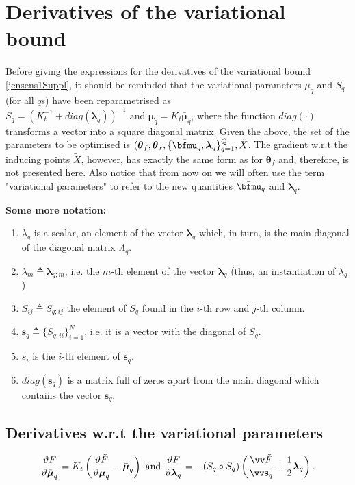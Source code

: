 
\section{Derivatives of the variational bound}
Before giving the expressions for the derivatives of the variational bound \eqref{jensens1Suppl},
it should be reminded that the variational parameters $\mu_q$ and $S_q$ (for all $q$s) have been
reparametrised as $S_q = \left( \mathit{K}_t^{-1} + diag(\boldsymbol \lambda_q) \right)^{-1}  \text{ and }   \boldsymbol \mu_q = K_t \bar{\boldsymbol \mu}_q$, where the function $diag(\cdot)$ transforms a vector into a square diagonal matrix. Given the above, the set of the parameters to be optimised is 
$( \boldsymbol \theta_f, \boldsymbol \theta_x, \{ \bar{\bfmu}_q, \boldsymbol \lambda_q \}_{q=1}^Q, \tilde{X}$. The gradient w.r.t the inducing points $\tilde{X}$, however, has exactly the same form as for $\boldsymbol \theta_f$ and, therefore, is not presented here. Also notice that from now on we will often use the term "variational parameters" to refer to the new quantities $\bar{\bfmu}_q$ and $\boldsymbol \lambda_q$. 

\textbf{Some more notation:} 
\begin{enumerate}
\item $\lambda_q$ is a scalar, an element of the vector $\boldsymbol \lambda_q$ which, in turn, is the main diagonal of the diagonal matrix $\Lambda_q$. 
\item$\lambda_m \triangleq \boldsymbol \lambda_{q;m}$, i.e. the $m$-th element of the vector $\boldsymbol \lambda_q$ (thus, an instantiation of $\lambda_q$)
\item $S_{ij} \triangleq S_{q;ij}$ the element of $S_q$ found in the $i$-th row and $j$-th column.
\item $\mathbf{s}_q \triangleq \lbrace S_{q;ii} \rbrace_{i=1}^N$, i.e. it is a vector with the diagonal of $S_q$.
\item $s_i$ is the $i$-th element of $\mathbf{s}_q$.
\item $diag(\mathbf{s}_q)$ is a matrix full of zeros apart from the main diagonal which contains the vector $\mathbf{s}_q$.
\end{enumerate}

\subsection{Derivatives w.r.t the variational parameters}
\begin{equation}
    \label{derivVarParamSuppl}
\frac{\vartheta F}{\vartheta \bar{\boldsymbol \mu}_q} 
=  K_t \left( \frac{\vartheta \tilde{F}}{\vartheta \boldsymbol \mu_q} - \bar{\boldsymbol \mu}_q \right)
\text{ and }
 \frac{\vartheta F}{\vartheta \boldsymbol \lambda_q}
= - ( S_q \circ S_q) \left( \frac{\vv \tilde{F}}{\vv \mathbf{s}_q} + \frac{1}{2} \boldsymbol \lambda_q \right).
\end{equation}

